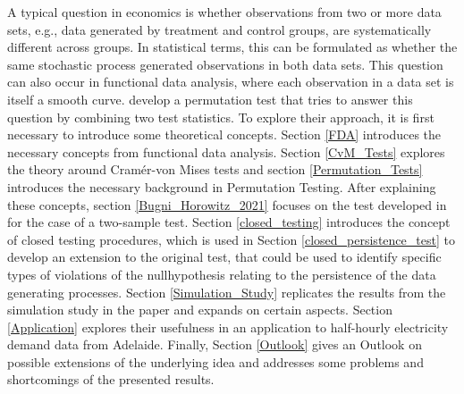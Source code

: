 \documentclass[12pt, a4paper]{article}
\theoremstyle{MAstyle} \newtheorem{assumption}{Assumption}[section]
\theoremstyle{MAstyle} \newtheorem{definition}{Definition}[section]
\theoremstyle{MAstyle} \newtheorem{theorem}{Theorem}[section]
\begin{document}
		A typical question in economics is whether observations from two or more data sets, e.g., data generated by treatment and control groups, are systematically different across groups. In statistical terms, this can be formulated as whether the same stochastic process generated observations in both data sets.				
		This question can also occur in functional data analysis, where each observation in a data set is itself a smooth curve. \cite{bugni_permutation_2021} develop a permutation test that tries to answer this question by combining two test statistics. To explore their approach, it is first necessary to introduce some theoretical concepts.
		Section \ref{FDA} introduces the necessary concepts from functional data analysis. 
		Section \ref{CvM_Tests} explores the theory around Cram\'{e}r-von Mises tests and section \ref{Permutation_Tests} introduces the necessary background in Permutation Testing.
		After explaining these concepts, section \ref{Bugni_Horowitz_2021} focuses on the test developed in \cite{bugni_permutation_2021} for the case of a two-sample test. Section \ref{closed_testing} introduces the concept of closed testing procedures, which is used in Section \ref{closed_persistence_test} to develop an extension to the original test, that could be used to identify specific types of violations of the nullhypothesis relating to the persistence of the data generating processes. Section \ref{Simulation_Study} replicates the results from the simulation study in the paper and expands on certain aspects. Section \ref{Application} explores their usefulness in an application to half-hourly electricity demand data from Adelaide.
		Finally, Section \ref{Outlook} gives an Outlook on possible extensions of the underlying idea and addresses some problems and shortcomings of the presented results.
	
\end{document}
